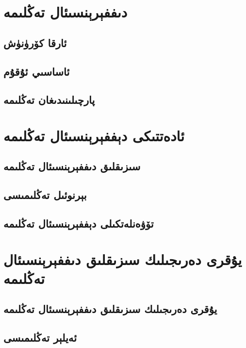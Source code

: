 
\section{دىففېرېنسىئال تەڭلىمە}
\subsection{ئارقا كۆرۈنۈش}
\subsection{ئاساسىي ئۇقۇم}
\subsection{پارچىلىنىدىغان تەڭلىمە}

\section{ئادەتتىكى دېففېرېنسىئال تەڭلىمە}
\subsection{سىزىقلىق دىففېرېنسىئال تەڭلىمە}
\subsection{بېرنوئىل تەڭلىمىسى}
\subsection{تۆۋەنلەتكىلى دېففېرېنسىئال تەڭلىمە}

\section{يۇقرى دەرىجىلىك سىزىقلىق دىففېرېنسىئال تەڭلىمە}
\subsection{يۇقرى دەرىجىلىك سىزىقلىق دىففېرېنسىئال تەڭلىمە}
\subsection{ئەيلېر تەڭلىمىسى}


